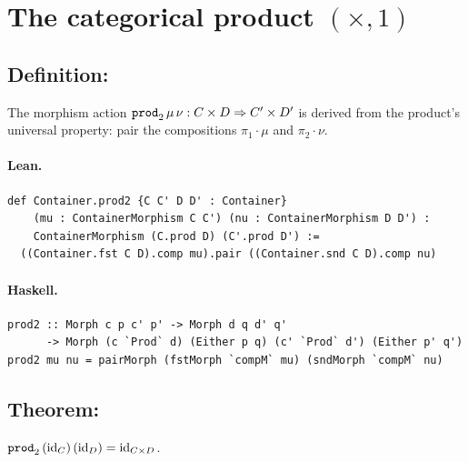 \documentclass[11pt,a4paper]{article}
\begin{document}
\section{The categorical product \texorpdfstring{$(\times, 1)$}{(times, 1)}}

\subsection{Definition: }

\begin{defn}
The morphism action $\texttt{prod}_2\,\mu\,\nu : C \times D \Rightarrow C' \times D'$
is derived from the product's universal property: pair the compositions
$\pi_1 \cdot \mu$ and $\pi_2 \cdot \nu$.
\end{defn}

\paragraph{Lean.}
\begin{lstlisting}[style=lean]
def Container.prod2 {C C' D D' : Container}
    (mu : ContainerMorphism C C') (nu : ContainerMorphism D D') :
    ContainerMorphism (C.prod D) (C'.prod D') :=
  ((Container.fst C D).comp mu).pair ((Container.snd C D).comp nu)
\end{lstlisting}

\paragraph{Haskell.}
\begin{lstlisting}[style=haskell]
prod2 :: Morph c p c' p' -> Morph d q d' q'
      -> Morph (c `Prod` d) (Either p q) (c' `Prod` d') (Either p' q')
prod2 mu nu = pairMorph (fstMorph `compM` mu) (sndMorph `compM` nu)
\end{lstlisting}


\subsection{Theorem: }

\begin{thm}
$\texttt{prod}_2\,(\mathrm{id}_C)\,(\mathrm{id}_D) = \mathrm{id}_{C \times D}$.
\end{thm}
\end{document}
